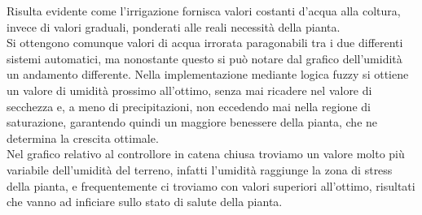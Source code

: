 \documentclass[conference,10pt]{IEEEtran}
\begin{document}
Risulta evidente come l'irrigazione fornisca valori costanti d'acqua alla coltura, invece di valori graduali, ponderati alle reali necessità della pianta.\\
Si ottengono comunque valori di acqua irrorata paragonabili tra i due differenti sistemi automatici, ma nonostante questo si può notare dal grafico dell'umidità un andamento differente. Nella implementazione mediante logica fuzzy si ottiene un valore di umidità prossimo all'ottimo, senza mai ricadere nel valore di secchezza e, a meno di precipitazioni, non eccedendo mai nella regione di saturazione, garantendo quindi un maggiore benessere della pianta, che ne determina la crescita ottimale.\\
Nel grafico relativo al controllore in catena chiusa troviamo un valore molto più variabile dell'umidità del terreno, infatti l'umidità raggiunge la zona di stress della pianta, e frequentemente ci troviamo con valori superiori all'ottimo, risultati che vanno ad inficiare sullo stato di salute della pianta.





\end{document}
